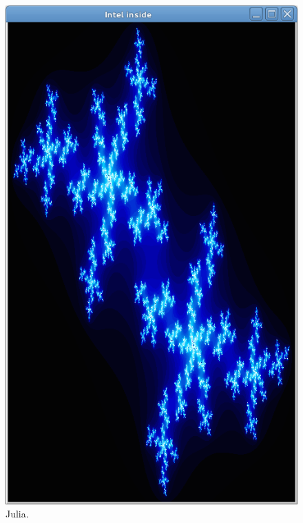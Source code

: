 \begin{figure}
  \includegraphics[width=\linewidth]{img/imgjulia.png}
  \caption[Julia benchmark screen capture]{Julia.}
  \label{fig:benchmarks_julia}
  \endminipage\hfill

\end{figure}
